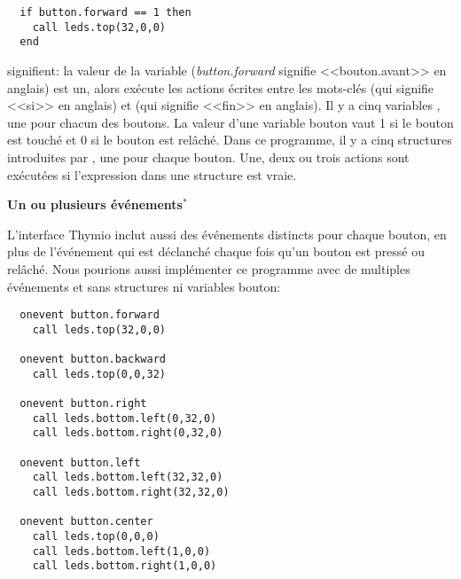 \begin{footnotesize}
\begin{verbatim}
  if button.forward == 1 then
    call leds.top(32,0,0)
  end
\end{verbatim}
\end{footnotesize}

signifient:  la valeur de la variable  (\emph{button.forward} signifie
<<bouton.avant>> en anglais) est un,
alors exécute les actions écrites entre les mots-clés  (qui signifie <<si>> en anglais)
et  (qui signifie <<fin>> en anglais).
Il y a cinq variables , une pour chacun des boutons.
La valeur d'une variable bouton vaut 1 si le bouton est touché et 0 si le bouton est relâché.
Dans ce programme, il y a cinq structures introduites par , une pour chaque bouton.
Une, deux ou trois actions sont exécutées si l'expression dans une structure  est vraie.


\textbf{\large Un ou plusieurs événements$^*$}

L'interface Thymio inclut aussi des événements distincts pour chaque bouton,
en plus de l'événement  qui est déclanché chaque fois qu'un bouton est pressé ou relâché.
Nous pourions aussi implémenter ce programme avec de multiples événements et sans structures
 ni variables bouton:

\begin{footnotesize}
\begin{verbatim}
  onevent button.forward
    call leds.top(32,0,0)
  
  onevent button.backward
    call leds.top(0,0,32)
  
  onevent button.right
    call leds.bottom.left(0,32,0)
    call leds.bottom.right(0,32,0)
  
  onevent button.left
    call leds.bottom.left(32,32,0)
    call leds.bottom.right(32,32,0)
  
  onevent button.center
    call leds.top(0,0,0)
    call leds.bottom.left(1,0,0)
    call leds.bottom.right(1,0,0)
\end{verbatim}
\end{footnotesize}

